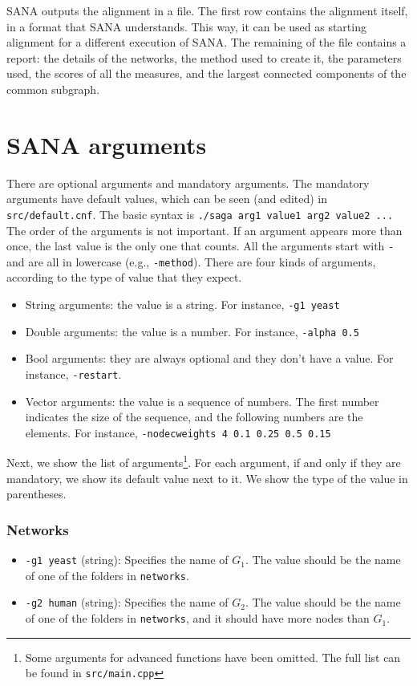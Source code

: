 \documentclass[]{article}
\begin{document}
SANA outputs the alignment in a file. The first row contains the alignment itself, in a format that SANA understands. This way, it can be used as starting alignment for a different execution of SANA. The remaining of the file contains a report: the details of the networks, the method used to create it, the parameters used, the scores of all the measures, and the largest connected components of the common subgraph.


\section{SANA arguments}\label{b:args}
There are optional arguments and mandatory arguments. The mandatory arguments have default values, which can be seen (and edited) in \texttt{src/default.cnf}. The basic syntax is \texttt{./saga arg1 value1 arg2 value2 ...} The order of the arguments is not important. If an argument appears more than once, the last value is the only one that counts. All the arguments start with \texttt{-} and are all in lowercase (e.g., \texttt{-method}). There are four kinds of arguments, according to the type of value that they expect.
\begin{itemize}
\item String arguments: the value is a string. For instance, \texttt{-g1 yeast}
\item Double arguments: the value is a number. For instance, \texttt{-alpha 0.5}
\item Bool arguments: they are always optional and they don't have a value. For instance, \texttt{-restart}.
\item Vector arguments: the value is a sequence of numbers. The first number indicates the size of the sequence, and the following numbers are the elements. For instance, \texttt{-nodecweights 4 0.1 0.25 0.5 0.15}
\end{itemize}

Next, we show the list of arguments\footnote{Some arguments for advanced functions have been omitted. The full list can be found in \texttt{src/main.cpp}}. For each argument, if and only if they are mandatory, we show its default value next to it. We show the type of the value in parentheses.
\subsubsection*{Networks}
\begin{itemize}
\item\texttt{-g1 yeast} (string): Specifies the name of $G_1$. The value should be the name of one of the folders in \texttt{networks}.
\item\texttt{-g2 human} (string): Specifies the name of $G_2$. The value should be the name of one of the folders in \texttt{networks}, and it should have more nodes than $G_1$.
\end{itemize}
\end{document}
